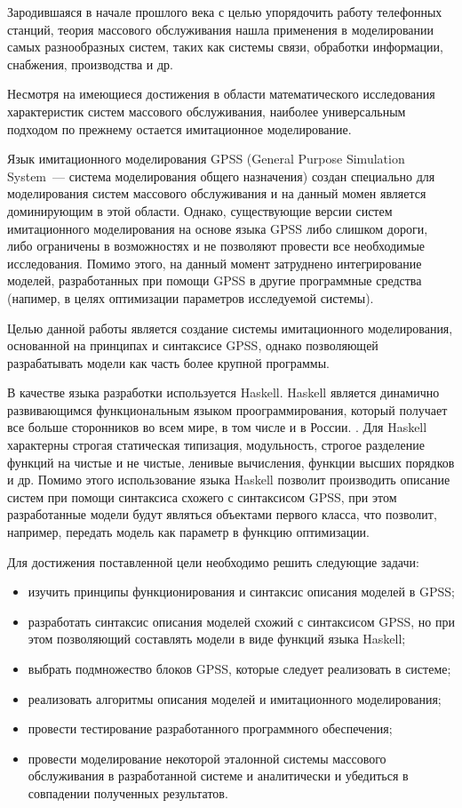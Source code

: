 \Introduction

Зародившаяся в начале прошлого века с целью упорядочить работу телефонных станций, теория массового обслуживания нашла применения в моделировании самых разнообразных систем, таких как системы связи, обработки информации, снабжения, производства и др.

Несмотря на имеющиеся достижения в области математического исследования характеристик систем массового обслуживания, наиболее универсальным подходом по прежнему остается имитационное моделирование.

Язык имитационного моделирования GPSS (General Purpose Simulation System~--- система моделирования общего назначения) создан специально для моделирования систем массового обслуживания и на данный момен является доминирующим в этой области. Однако, существующие версии систем имитационного моделирования на основе языка GPSS либо слишком дороги, либо ограничены в возможностях и не позволяют провести все необходимые исследования.\cite{KST} Помимо этого, на данный момент затруднено интегрирование моделей, разработанных при помощи GPSS в другие программные средства (напимер, в целях оптимизации параметров исследуемой системы).

Целью данной работы является создание системы имитационного моделирования, основанной на принципах и синтаксисе GPSS, однако позволяющей разрабатывать модели как часть более крупной программы.

В качестве языка разработки используется  Haskell. Haskell является динамично развивающимся функциональным языком проограммирования, который получает все больше сторонников во всем мире, в том числе и в России. \cite{HaskellRef}. Для Haskell характерны строгая статическая типизация, модульность, строгое разделение функций на чистые и не чистые, ленивые вычисления, функции высших порядков и др.\cite{Haskell} Помимо этого использование языка Haskell позволит производить описание систем при помощи синтаксиса схожего с синтаксисом GPSS, при этом разработанные модели будут являться объектами первого класса, что позволит, например, передать модель как параметр в функцию оптимизации.

Для достижения поставленной цели необходимо решить следующие задачи:
\begin{itemize}
\item изучить принципы функционирования и синтаксис описания моделей в GPSS;
\item разработать синтаксис описания моделей схожий с синтаксисом GPSS, но при этом позволяющий составлять модели в виде функций языка Haskell;
\item выбрать подмножество блоков GPSS, которые следует реализовать в системе;
\item реализовать алгоритмы описания моделей и имитационного моделирования;
\item провести тестирование разработанного программного обеспечения;
\item провести моделирование некоторой эталонной системы массового обслуживания в разработанной системе и аналитически и убедиться в совпадении полученных результатов.
\end{itemize}

